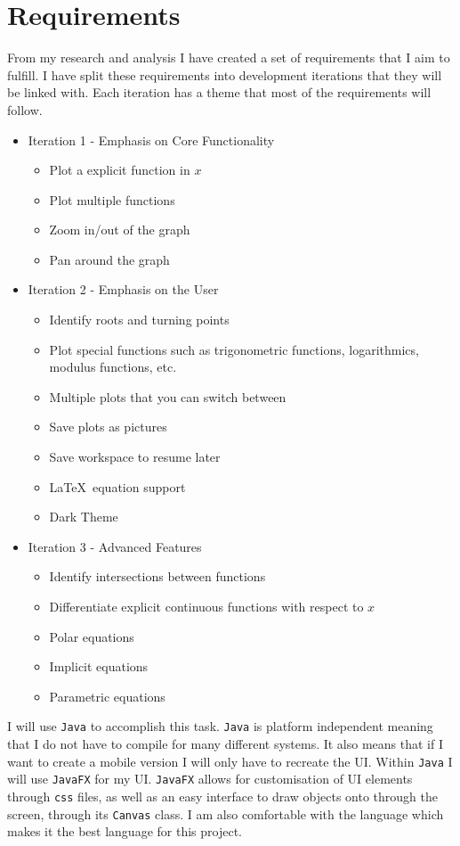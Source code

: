 \documentclass[../../../main.tex]{subfiles}
\begin{document}
\chapter{Requirements}
From my research and analysis I have created a set of requirements that I aim to fulfill. I have split these requirements into development iterations that they will be linked with. Each iteration has a theme that most of the requirements will follow.
\begin{itemize}
	\item Iteration 1 - Emphasis on Core Functionality
		\begin{itemize}
			\item Plot a explicit function in $x$
			\item Plot multiple functions
			\item Zoom in/out of the graph
			\item Pan around the graph
		\end{itemize}
	\item Iteration 2 - Emphasis on the User
		\begin{itemize}
			\item Identify roots and turning points 
			\item Plot special functions such as trigonometric functions, logarithmics, modulus functions, etc.
			\item Multiple plots that you can switch between
			\item Save plots as pictures
			\item Save workspace to resume later
			\item \LaTeX \ equation support
			\item Dark Theme
		\end{itemize}
	\item Iteration 3 - Advanced Features
		\begin{itemize}
			\item Identify intersections between functions
			\item Differentiate explicit continuous functions with respect to $x$
			\item Polar equations
			\item Implicit equations
			\item Parametric equations
		\end{itemize}
\end{itemize}
I will use \texttt{Java} to accomplish this task. \texttt{Java} is platform independent meaning that I do not have to compile for many different systems. It also means that if I want to create a mobile version I will only have to recreate the UI. Within \texttt{Java} I will use \texttt{JavaFX} for my UI. \texttt{JavaFX} allows for customisation of UI elements through \texttt{css} files, as well as an easy interface to draw objects onto through the screen, through its \texttt{Canvas} class.  I am also comfortable with the language which makes it the best language for this project.
\end{document}
